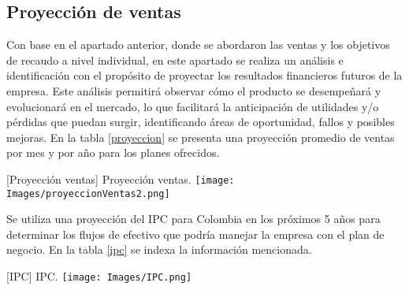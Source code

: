 \subsection{Proyección de ventas}

Con base en el apartado anterior, donde se abordaron las ventas y los objetivos de recaudo a nivel individual, en este apartado se realiza un análisis e identificación con el propósito de proyectar los resultados financieros futuros de la empresa. Este análisis permitirá observar cómo el producto se desempeñará y evolucionará en el mercado, lo que facilitará la anticipación de utilidades y/o pérdidas que puedan surgir, identificando áreas de oportunidad, fallos y posibles mejoras. En la tabla \ref{proyeccion} se presenta una proyección promedio de ventas por mes y por año para los planes ofrecidos.

\vspace{2mm}
\begin{minipage}{0.9\textwidth}
\centering
{}[{Proyección ventas}]{ Proyección ventas. }
\label{proyeccion}
\texttt{[image: Images/proyeccionVentas2.png]}
\end{minipage}

Se utiliza una proyección del IPC para Colombia en los próximos 5 años para determinar los flujos de efectivo que podría manejar la empresa con el plan de negocio. 
En la tabla \ref{ipc} se indexa la información mencionada.

\vspace{2mm}
\begin{minipage}{0.9\textwidth}
\centering
{}[{IPC}]{ IPC. }
\label{ipc}
\texttt{[image: Images/IPC.png]}
\end{minipage}
